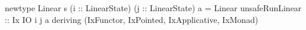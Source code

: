 \begin{code}
newtype Linear s (i :: LinearState)
                 (j :: LinearState) a = Linear
  { unsafeRunLinear :: Ix IO i j a
  }
  deriving (IxFunctor, IxPointed, IxApplicative, IxMonad)
\end{code}
